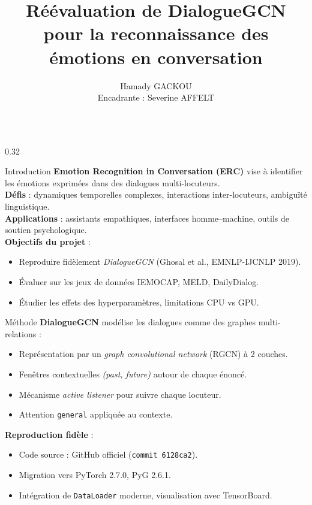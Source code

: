 \documentclass[final]{beamer}
\title{Réévaluation de DialogueGCN pour la reconnaissance des émotions en conversation}
\author{Hamady GACKOU\\\small Encadrante : Severine AFFELT}
\institute{Université Paris Cité -- Master AMSD\\\texttt{hamady.gackou@etu.u-paris.fr}}
\begin{document}
\begin{frame}[t]

\begin{columns}[t,totalwidth=\textwidth]

  \begin{column}{0.32\textwidth}
    \begin{block}{Introduction}
      \textbf{Emotion Recognition in Conversation (ERC)} vise à identifier les émotions exprimées dans des dialogues multi-locuteurs. \\
      \vspace{0.5em}
      \textbf{Défis} : dynamiques temporelles complexes, interactions inter-locuteurs, ambiguïté linguistique. \\
      \vspace{0.5em}
      \textbf{Applications} : assistants empathiques, interfaces homme--machine, outils de soutien psychologique. \\
      \vspace{1em}
      \textbf{Objectifs du projet} :
      \begin{itemize}
          \item Reproduire fidèlement \textit{DialogueGCN} (Ghosal et al., EMNLP-IJCNLP 2019).
          \item Évaluer sur les jeux de données IEMOCAP, MELD, DailyDialog.
          \item Étudier les effets des hyperparamètres, limitations CPU vs GPU.
      \end{itemize}
    \end{block}

    \begin{block}{Méthode}
      \textbf{DialogueGCN} modélise les dialogues comme des graphes multi-relations :
      \begin{itemize}
          \item Représentation par un \textit{graph convolutional network} (RGCN) à 2 couches.
          \item Fenêtres contextuelles \textit{(past, future)} autour de chaque énoncé.
          \item Mécanisme \textit{active listener} pour suivre chaque locuteur.
          \item Attention \texttt{general} appliquée au contexte.
      \end{itemize}
      
      \vspace{0.5em}
      \textbf{Reproduction fidèle} :
      \begin{itemize}
          \item Code source : GitHub officiel (\texttt{commit 6128ca2}).
          \item Migration vers PyTorch 2.7.0, PyG 2.6.1.
          \item Intégration de \texttt{DataLoader} moderne, visualisation avec TensorBoard.
      \end{itemize}
    \end{block}


\end{column}
\end{columns}
\end{frame}
\end{document}
